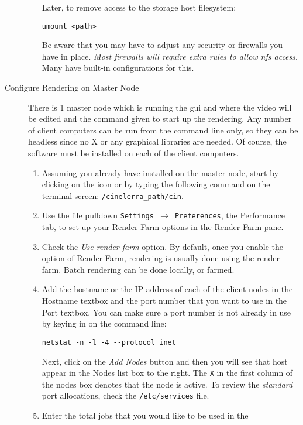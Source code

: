 \begin{description}
\begin{enumerate}
    Later, to remove access to the storage host filesystem:
\begin{lstlisting}[style=sh]
umount <path>
\end{lstlisting}

    Be aware that you may have to adjust any security or firewalls
    you have in place.  \textit{Most firewalls will require extra rules
      to allow nfs access}.  Many have built-in configurations for this.
  \end{enumerate}
\item[Configure Rendering on Master Node] There is 1 master node
  which is running the \CGG{} gui and where the video will be edited
  and the command given to start up the rendering.  Any number of
  client computers can be run from the command line only, so they can
  be headless since no X or any graphical libraries are needed.  Of
  course, the \CGG{} software must be installed on each of the client
  computers.
  \begin{enumerate}
  \item Assuming you already have \CGG{} installed on the master
    node, start \CGG{} by clicking on the icon or by typing the
    following command on the terminal screen:
    \texttt{/{cinelerra\_path}/cin}.
  \item Use the file pulldown \texttt{Settings $\rightarrow$
      Preferences}, the Performance tab, to set up your Render Farm
    options in the Render Farm pane.
  \item Check the \textit{Use render farm} option.  By default, once
    you enable the option of Render Farm, rendering is usually done
    using the render farm.  Batch rendering can be done locally, or
    farmed.
  \item Add the hostname or the IP address of each of the client
    nodes in the Hostname textbox and the port number that you want to
    use in the Port textbox.  You can make sure a port number is not
    already in use by keying in on the command line:
\begin{lstlisting}[style=sh]
netstat -n -l -4 --protocol inet
\end{lstlisting} Next, click on the \textit{Add Nodes} button and
    then you will see that host appear in the Nodes list box to the
    right.  The \texttt{X} in the first column of the nodes box denotes
    that the node is active.  To review the \textit{standard} port
    allocations, check the \texttt{/etc/services} file.
  \item Enter the total jobs that you would like to be used in the

\end{enumerate}
\end{description}
